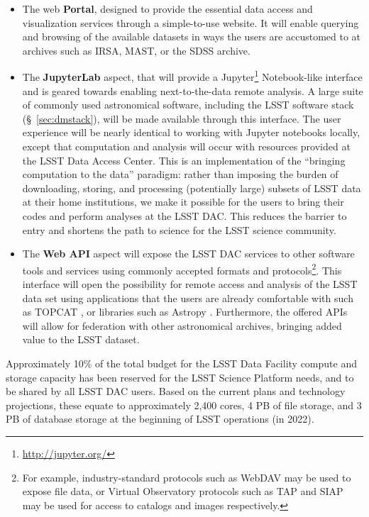 \begin{itemize}

\item The web \textbf{Portal}, designed to provide the essential data access and
visualization services through a simple-to-use website.  It will enable
querying and browsing of the available datasets in ways the users are
accustomed to at archives such as IRSA, MAST, or the SDSS archive.

\item The \textbf{JupyterLab} aspect, that will provide a
Jupyter\footnote{\url{http://jupyter.org/}} Notebook-like
interface and is geared towards enabling next-to-the-data remote analysis.
A large suite of commonly used astronomical software, including the LSST
software stack (\S~\ref{sec:dmstack}), will be made available through this
interface.  The user experience will be nearly identical to working with
Jupyter notebooks locally, except that computation and analysis will occur
with resources provided at the LSST Data Access Center.  This is an
implementation of the ``bringing computation to the data'' paradigm: rather
than imposing the burden of downloading, storing, and processing
(potentially large) subsets of LSST data at their home institutions, we make
it possible for the users to bring their codes and perform analyses at the
LSST DAC.  This reduces the barrier to entry and shortens the path to
science for the LSST science community.

\item The \textbf{Web API} aspect will expose the LSST DAC services to other
software tools and services using commonly accepted formats and protocols\footnote{For
example, industry-standard protocols such as WebDAV may be used to expose
file data, or Virtual Observatory protocols such as TAP and SIAP may
be used for access to catalogs and images respectively.}.  This interface will open the
possibility for remote access and analysis of the LSST data set using
applications that the users are already comfortable with such as
TOPCAT \citep{2005ASPC..347...29T}, or libraries such as Astropy \citep{2013A&A...558A..33A,2016SPIE.9913E..0GJ}.  Furthermore, the offered APIs will allow
for federation with other astronomical archives, bringing added value to the
LSST dataset.
\end{itemize}

Approximately 10\% of the total budget for the LSST Data Facility
compute and storage capacity has been reserved for the LSST Science Platform
needs, and to be shared by all LSST DAC users.  Based on the current plans and
technology projections, these equate to approximately 2,400 cores, 4 PB of
file storage, and 3 PB of database storage at the beginning of LSST
operations (in 2022).

